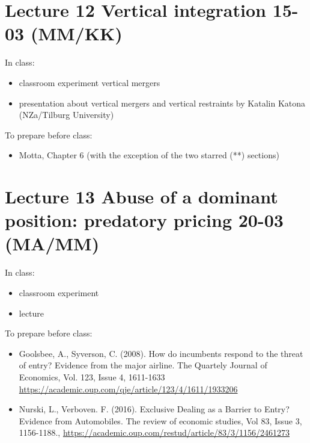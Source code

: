 \documentclass[]{book}
\providecommand{\tightlist}{%
  \setlength{\itemsep}{0pt}\setlength{\parskip}{0pt}}
\begin{document}
\section{Lecture 12 Vertical integration 15-03
(MM/KK)}\label{lecture-12-vertical-integration-15-03-mmkk}

In class:

\begin{itemize}
\tightlist
\item
  classroom experiment vertical mergers
\item
  presentation about vertical mergers and vertical restraints by Katalin
  Katona (NZa/Tilburg University)
\end{itemize}

To prepare before class:

\begin{itemize}
\tightlist
\item
  Motta, Chapter 6 (with the exception of the two starred (**) sections)
\end{itemize}

\section{Lecture 13 Abuse of a dominant position: predatory pricing
20-03
(MA/MM)}\label{lecture-13-abuse-of-a-dominant-position-predatory-pricing-20-03-mamm}

In class:

\begin{itemize}
\tightlist
\item
  classroom experiment
\item
  lecture
\end{itemize}

To prepare before class:

\begin{itemize}
\tightlist
\item
  Goolsbee, A., Syverson, C. (2008). How do incumbents respond to the
  threat of entry? Evidence from the major airline. The Quartely Journal
  of Economics, Vol. 123, Issue 4, 1611-1633
  \url{https://academic.oup.com/qje/article/123/4/1611/1933206}
\item
  Nurski, L., Verboven. F. (2016). Exclusive Dealing as a Barrier to
  Entry? Evidence from Automobiles. The review of economic studies, Vol
  83, Issue 3, 1156-1188.,
  \url{https://academic.oup.com/restud/article/83/3/1156/2461273}
\end{itemize}
\end{document}
